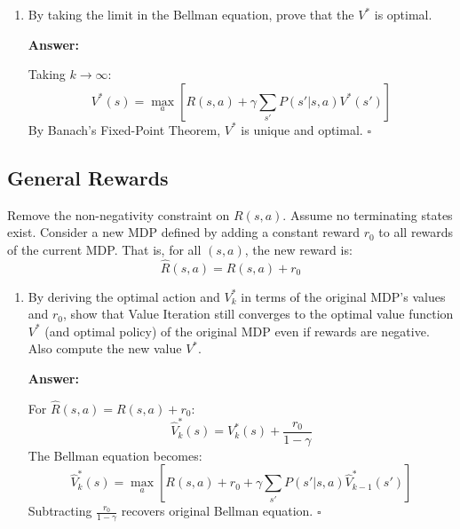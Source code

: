 \documentclass[12pt]{article}
\begin{document}
{{\begin{enumerate}
    
    \item  
    By taking the limit in the Bellman equation, prove that the \( V^* \) is optimal.

    \textbf{Answer:}
    
    Taking \(k \to \infty\):
    \[
    V^*(s) = \max_a \left[ R(s,a) + \gamma \sum_{s'} P(s'|s,a) V^*(s') \right]
    \]
    By Banach's Fixed-Point Theorem, \(V^*\) is unique and optimal. \hfill \(\square\)


 \end{enumerate}
   \subsection{General Rewards}
   
    Remove the non-negativity constraint on \( R(s, a) \). Assume no terminating states exist.
    Consider a new MDP defined by adding a constant reward \( r_0 \) to all rewards of the current MDP. That is, for all \( (s, a) \), the new reward is:
\[
\hat{R}(s, a) = R(s, a) + r_0
\]
    
    \begin{enumerate}[resume*]
      
        \item 
        By deriving the optimal action and \( V^*_k \) in terms of the original MDP’s values and $r_0$, show that Value Iteration still converges to the optimal value function \( V^* \) (and optimal policy) of the original MDP even if rewards are negative. Also compute the new value \( V^* \).  
  

        \textbf{Answer:}
        
        For \(\hat{R}(s,a) = R(s,a) + r_0\):
        \[
        \hat{V}_k^*(s) = V_k^*(s) + \frac{r_0}{1-\gamma}
        \]
        The Bellman equation becomes:
        \[
        \hat{V}_k^*(s) = \max_a \left[ R(s,a) + r_0 + \gamma \sum_{s'} P(s'|s,a) \hat{V}_{k-1}^*(s') \right]
        \]
        Subtracting \(\frac{r_0}{1-\gamma}\) recovers original Bellman equation. \hfill \(\square\)
        


\end{enumerate}}}
\end{document}
